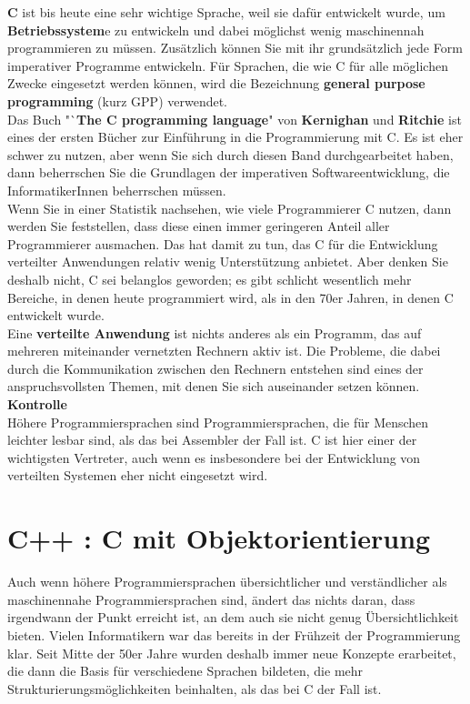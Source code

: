 \textbf{C} ist bis heute eine sehr wichtige Sprache, weil sie dafür entwickelt wurde, um \textbf{Betriebssystem}e zu entwickeln und dabei möglichst wenig maschinennah programmieren zu müssen. Zusätzlich können Sie mit ihr grundsätzlich jede Form imperativer Programme entwickeln. Für Sprachen, die wie C für alle möglichen Zwecke eingesetzt werden können, wird die Bezeichnung \textbf{general purpose programming} (kurz GPP) verwendet.\\

Das Buch "`\textbf{The C programming language}" von \textbf{Kernighan} und \textbf{Ritchie} ist eines der ersten Bücher zur Einführung in die Programmierung mit C. Es ist eher schwer zu nutzen, aber wenn Sie sich durch diesen Band durchgearbeitet haben, dann beherrschen Sie die Grundlagen der imperativen Softwareentwicklung, die InformatikerInnen beherrschen müssen.\\

Wenn Sie in einer Statistik nachsehen, wie viele Programmierer C nutzen, dann werden Sie feststellen, dass diese einen immer geringeren Anteil aller Programmierer ausmachen. Das hat damit zu tun, das C für die Entwicklung verteilter Anwendungen relativ wenig Unterstützung anbietet. Aber denken Sie deshalb nicht, C sei belanglos geworden; es gibt schlicht wesentlich mehr Bereiche, in denen heute programmiert wird, als in den 70er Jahren, in denen C entwickelt wurde.\\

Eine \textbf{verteilte Anwendung} ist nichts anderes als ein Programm, das auf mehreren miteinander vernetzten Rechnern aktiv ist. Die Probleme, die dabei durch die Kommunikation zwischen den Rechnern entstehen sind eines der anspruchsvollsten Themen, mit denen Sie sich auseinander setzen können. \\

\textbf{Kontrolle}\\
Höhere Programmiersprachen sind Programmiersprachen, die für Menschen leichter lesbar sind, als das bei Assembler der Fall ist. C ist hier einer der wichtigsten Vertreter, auch wenn es insbesondere bei der Entwicklung von verteilten Systemen eher nicht eingesetzt wird.

\section{C++ : C mit Objektorientierung}
Auch wenn höhere Programmiersprachen übersichtlicher und verständlicher als maschinennahe Programmiersprachen sind, ändert das nichts daran, dass irgendwann der Punkt erreicht ist, an dem auch sie nicht genug Übersichtlichkeit bieten. Vielen Informatikern war das bereits in der Frühzeit der Programmierung klar. Seit Mitte der 50er Jahre wurden deshalb immer neue Konzepte erarbeitet, die dann die Basis für verschiedene Sprachen bildeten, die mehr Strukturierungsmöglichkeiten beinhalten, als das bei C der Fall ist.\\

